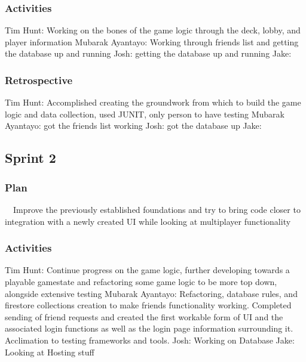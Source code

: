 \documentclass[12pt]{article}
\begin{document}
\subsubsection{Activities}
Tim Hunt: Working on the bones of the game logic through the deck, lobby, and player information \newline
Mubarak Ayantayo: Working through friends list and getting the database up and running \newline
Josh: getting the database up and running \newline
Jake:
\subsubsection{Retrospective}
Tim Hunt: Accomplished creating the groundwork from which to build the game logic and data collection, used JUNIT, only person to have testing \newline
Mubarak Ayantayo: got the friends list working \newline
Josh: got the database up \newline
Jake: 
\subsection{Sprint 2}
\subsubsection{Plan}
\ \ Improve the previously established foundations and try to bring code closer to integration with a newly created UI while looking at multiplayer functionality
\subsubsection{Activities}
Tim Hunt: Continue progress on the game logic, further developing towards a playable gamestate and refactoring some game logic to be more top down, alongside extensive testing \newline
Mubarak Ayantayo: Refactoring, database rules, and firestore collections creation to make friends functionality working. Completed sending of friend requests and created the first workable form of UI and the associated login functions as well as the login page information surrounding it. Acclimation to testing frameworks and tools. \newline
Josh: Working on Database \newline
Jake: Looking at Hosting stuff \newline 
\end{document}
